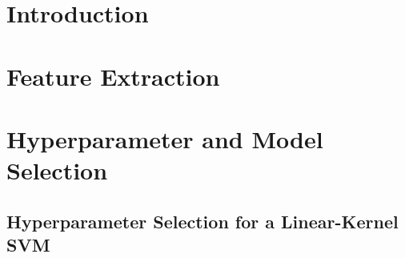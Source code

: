 \documentclass[11pt, answers]{exam}
\author{\hmwkAuthorName}
\begin{document}
  \section{Introduction}%
  \label{sec:introduction}

  \section{Feature Extraction}%
  \label{sec:feature_extraction}

  \begin{solution}\begin{parts}
    \part
    \part
    \part
  \end{parts}\end{solution}

  \section{Hyperparameter and Model Selection}%
  \label{sec:hyperparameter_and_model_selection}

  \subsection{Hyperparameter Selection for a Linear-Kernel SVM}%
  \label{sub:hyperparameter_selection_for_a_linear_kernel_svm}

  \begin{solution}\begin{parts}
    \part
    \part
    \part
    \part
    \part
    \part
    \part
  \end{parts}\end{solution}
\end{document}
